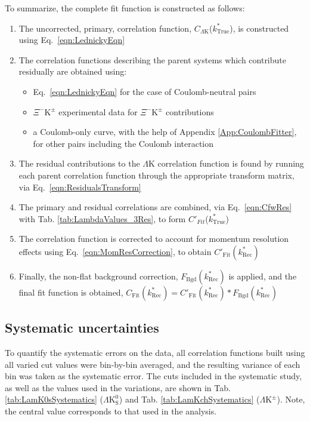 \documentclass[ALICE,manyauthors]{cernphprep}
\newcommand{\ktrue}{$k^{*}_{\mathrm{True}}$\xspace}
\newcommand{\LamK}{$\Lambda$K\xspace}
\newcommand{\LamKpm}{$\Lambda\mathrm{K^{\pm}}$\xspace}
\newcommand{\LamKs}{$\Lambda\mathrm{K^{0}_{S}}$\xspace}
\newcommand{\XiKpm}{$\Xi^{-}\mathrm{K^{\pm}}$\xspace}
\begin{document}
To summarize, the complete fit function is constructed as follows:
\begin{enumerate}
 \item The uncorrected, primary, correlation function, $C_{\Lambda\mathrm{K}}$(\ktrue), is constructed using Eq.\ \ref{eqn:LednickyEqn}
 \item The correlation functions describing the parent systems which contribute residually are obtained using:
 \begin{itemize}
  \item Eq.\ \ref{eqn:LednickyEqn} for the case of Coulomb-neutral pairs
  \item \XiKpm experimental data for \XiKpm contributions
  \item a Coulomb-only curve, with the help of Appendix \ref{App:CoulombFitter}, for other pairs including the Coulomb interaction 
 \end{itemize} 
 \item The residual contributions to the \LamK correlation function is found by running each parent correlation function through the appropriate transform matrix, via Eq.\ \ref{eqn:ResidualsTransform}
 \item The primary and residual correlations are combined, via Eq.\ \ref{eqn:CfwRes} with Tab. \ref{tab:LambdaValues_3Res}, to form $C'_{Fit}$(\ktrue)
 \item The correlation function is corrected to account for momentum resolution effects using Eq.\ \ref{eqn:MomResCorrection}, to obtain $C'_{\mathrm{Fit}}(k^{*}_{\mathrm{Rec}})$
 \item Finally, the non-flat background correction, $F_{\mathrm{Bgd}}(k^{*}_{\mathrm{Rec}})$ is applied, and the final fit function is obtained, $C_{\mathrm{Fit}}(k^{*}_{\mathrm{Rec}}) = C'_{\mathrm{Fit}}(k^{*}_{\mathrm{Rec}})*F_{\mathrm{Bgd}}(k^{*}_{\mathrm{Rec}})$
\end{enumerate}

\subsection{Systematic uncertainties}
\label{SysErrs}

To quantify the systematic errors on the data, all correlation functions built using all varied cut values were bin-by-bin averaged, and the resulting variance of each bin was taken as the systematic error.  
The cuts included in the systematic study, as well as the values used in the variations, are shown in Tab. \ref{tab:LamK0sSystematics} (\LamKs) and Tab. \ref{tab:LamKchSystematics} (\LamKpm).  
Note, the central value corresponds to that used in the analysis.
\end{document}
